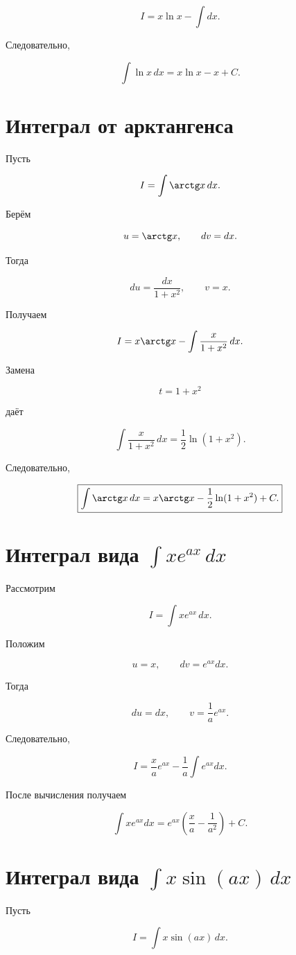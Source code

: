 \documentclass[14pt]{extreport}
\begin{document}
\[
I=x\ln x-\int dx.
\]

Следовательно,

\[
\boxed{
\int\ln x\,dx
=
x\ln x-x+C.
}
\]

\section{Интеграл от арктангенса}

Пусть

\[
I=\int\arctg x\,dx.
\]

Берём

\[
u=\arctg x,
\qquad
dv=dx.
\]

Тогда

\[
du=\frac{dx}{1+x^2},
\qquad
v=x.
\]

Получаем

\[
I
=
x\arctg x
-
\int\frac{x}{1+x^2}\,dx.
\]

Замена

\[
t=1+x^2
\]

даёт

\[
\int\frac{x}{1+x^2}\,dx
=
\frac12\ln(1+x^2).
\]

Следовательно,

\[
\boxed{
\int\arctg x\,dx
=
x\arctg x
-\frac12\ln(1+x^2)
+C.
}
\]

\section{Интеграл вида
$\int x e^{ax}\,dx$}

Рассмотрим

\[
I=\int xe^{ax}\,dx.
\]

Положим

\[
u=x,
\qquad
dv=e^{ax}dx.
\]

Тогда

\[
du=dx,
\qquad
v=\frac1a e^{ax}.
\]

Следовательно,

\[
I
=
\frac{x}{a}e^{ax}
-
\frac1a\int e^{ax}dx.
\]

После вычисления получаем

\[
\boxed{
\int xe^{ax}dx
=
e^{ax}
\left(
\frac{x}{a}
-\frac1{a^2}
\right)
+C.
}
\]

\section{Интеграл вида
$\int x\sin(ax)\,dx$}

Пусть

\[
I=\int x\sin(ax)\,dx.
\]
\end{document}

